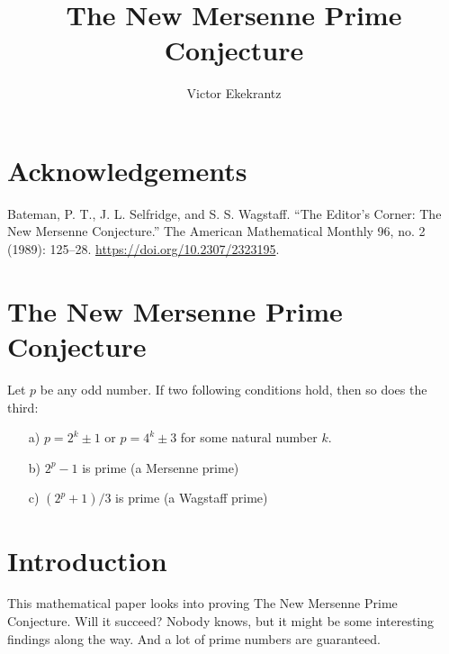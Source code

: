 \documentclass[12pt,a4paper]{article}
\author{Victor Ekekrantz}
\title{The New Mersenne Prime Conjecture}
\begin{document}
\maketitle
\newpage
\tableofcontents
\newpage

\section{Acknowledgements}
Bateman, P. T., J. L. Selfridge, and S. S. Wagstaff. “The Editor’s Corner: The New Mersenne Conjecture.” The American Mathematical Monthly 96, no. 2 (1989): 125–28. \url{https://doi.org/10.2307/2323195}.

\section*{The New Mersenne Prime Conjecture}
Let $p$ be any odd number. If two following conditions hold, then so does the third:
\begin{itemize}
	\item[a)] $p=2^k\pm 1$ or $p=4^k\pm 3$ for some natural number $k$.
	\item[b)] $2^p - 1$ is prime (a Mersenne prime)
	\item[c)] $(2^p+1)/3$ is prime (a Wagstaff prime)
\end{itemize}

\section{Introduction}
This mathematical paper looks into proving The New Mersenne Prime Conjecture. Will it succeed? Nobody knows, but it might be some interesting findings along the way. And a lot of prime numbers are guaranteed.


{}
\end{document}
